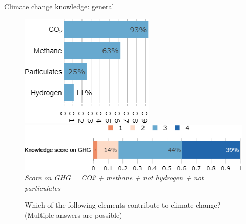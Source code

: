 \documentclass[aspectratio=169,9pt,dvipsnames]{beamer}
\begin{document}
\begin{frame}{Climate change knowledge: general}%
\begin{figure}[h!]
\centering
\caption{Which of the following elements contribute to climate change? (Multiple answers are possible)  }
\centering
\includegraphics[width=.35\textwidth]{../figures/DK/GHG_DK.png}
\vspace{.2cm} \\
\includegraphics[width=.7\textwidth]{../figures/DK/score_GHG_DK.png}
\textit{Score on GHG = CO2 + methane + \textit{not} hydrogen + \textit{not}  particulates}
\end{figure}
\end{frame}

\end{document}
